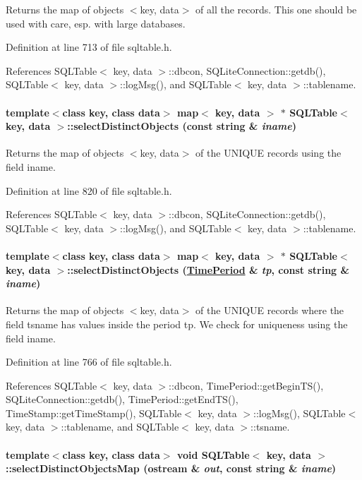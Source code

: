 Returns the map of objects $<$key, data$>$ of all the records. This one should be used with care, esp. with large databases. 

Definition at line 713 of file sqltable.h.

References SQLTable$<$ key, data $>$::dbcon, SQLite\-Connection::getdb(), SQLTable$<$ key, data $>$::log\-Msg(), and SQLTable$<$ key, data $>$::tablename.\hypertarget{classSQLTable_SQLTablea15}{
\paragraph[selectDistinctObjects]{\setlength{\rightskip}{0pt plus 5cm}template$<$class key, class data$>$ map$<$ key, data $>$ $\ast$ SQLTable$<$ key, data $>$::select\-Distinct\-Objects (const string \& {\em iname})}\hfill}
\label{classSQLTable_SQLTablea15}


Returns the map of objects $<$key, data$>$ of the UNIQUE records using the field iname. 

Definition at line 820 of file sqltable.h.

References SQLTable$<$ key, data $>$::dbcon, SQLite\-Connection::getdb(), SQLTable$<$ key, data $>$::log\-Msg(), and SQLTable$<$ key, data $>$::tablename.\hypertarget{classSQLTable_SQLTablea14}{
\paragraph[selectDistinctObjects]{\setlength{\rightskip}{0pt plus 5cm}template$<$class key, class data$>$ map$<$ key, data $>$ $\ast$ SQLTable$<$ key, data $>$::select\-Distinct\-Objects (\hyperlink{classTimePeriod}{Time\-Period} \& {\em tp}, const string \& {\em iname})}\hfill}
\label{classSQLTable_SQLTablea14}


Returns the map of objects $<$key, data$>$ of the UNIQUE records where the field tsname has values inside the period tp. We check for uniqueness using the field iname. 

Definition at line 766 of file sqltable.h.

References SQLTable$<$ key, data $>$::dbcon, Time\-Period::get\-Begin\-TS(), SQLite\-Connection::getdb(), Time\-Period::get\-End\-TS(), Time\-Stamp::get\-Time\-Stamp(), SQLTable$<$ key, data $>$::log\-Msg(), SQLTable$<$ key, data $>$::tablename, and SQLTable$<$ key, data $>$::tsname.\hypertarget{classSQLTable_SQLTablea17}{
\paragraph[selectDistinctObjectsMap]{\setlength{\rightskip}{0pt plus 5cm}template$<$class key, class data$>$ void SQLTable$<$ key, data $>$::select\-Distinct\-Objects\-Map (ostream \& {\em out}, const string \& {\em iname})}\hfill}
\label{classSQLTable_SQLTablea17}


